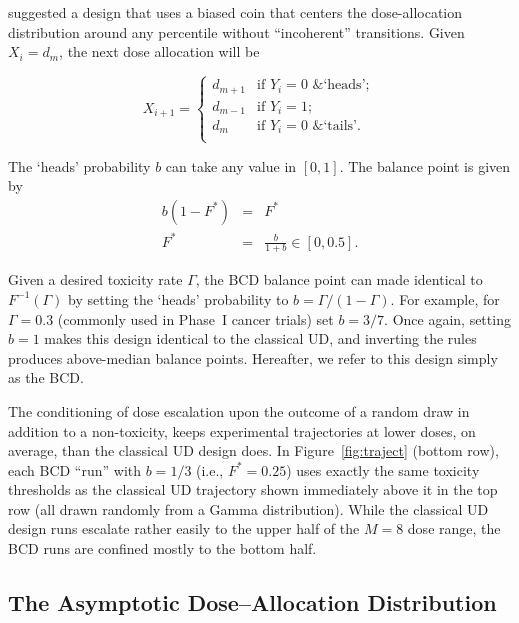 \cite{Durh:Flou:rand:1994} suggested a design that uses a biased coin that centers the dose-allocation distribution around any percentile without ``incoherent'' transitions. Given $X_i=d_m$, the next dose allocation will be

\begin{equation}\label{eq:DF_BCD}
X_{i+1}=
\begin{cases}
d_{m+1} &\textrm{if $Y_i=0$ \& `heads'};\\
d_{m-1} &\textrm{if $Y_i=1$};\\
d_m &\textrm{if $Y_i=0$ \& `tails'}.\\
\end{cases}
\end{equation}

The `heads' probability $b$ can take any value in $[0,1]$. The balance point is given by
\begin{equation}\label{eq:bcdx*}
\begin{array}{rcl}
    b\left(1-F^*\right) &=& F^*\\
    F^* &=& \frac{b}{1+b}\in[0,0.5].
\end{array}
\end{equation}

Given a desired toxicity rate $\Gamma$, the BCD balance point can made identical to $F^{-1}(\Gamma)$ by setting the `heads' probability to $b=\Gamma/(1-\Gamma)$. For example, for $\Gamma=0.3$ (commonly used in Phase~I cancer trials) set $b=3/7$. Once again, setting $b=1$ makes this design identical to the classical UD, and inverting the rules produces above-median balance points. Hereafter, we refer to this design simply as the BCD.

The conditioning of dose escalation upon the outcome of a random draw in addition to a non-toxicity, keeps experimental trajectories at lower doses, on average, than the classical UD design does. In Figure~\ref{fig:traject} (bottom row), each BCD ``run'' with $b=1/3$ (i.e., $F^*=0.25$) uses exactly the same toxicity thresholds as the classical UD trajectory shown immediately above it in the top row (all drawn randomly from a Gamma distribution). While the classical UD design runs escalate rather easily to the upper half of the $M=8$ dose range, the BCD runs are confined mostly to the bottom half.

\subsection{The Asymptotic Dose--Allocation Distribution}\label{sec:pi}

